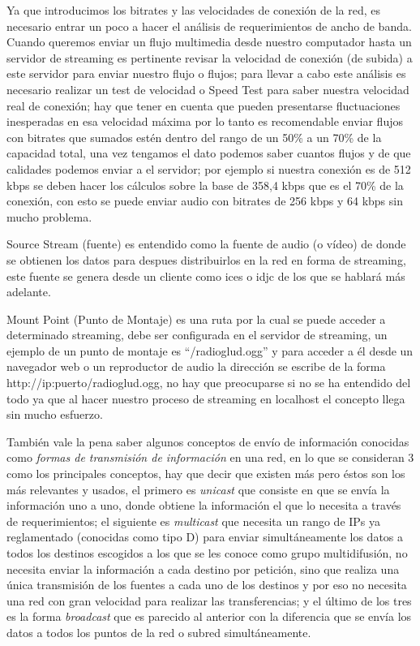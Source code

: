 \begin{multicols}{2}
Ya que introducimos los bitrates y las velocidades de conexión de la red, es necesario entrar un poco a hacer el análisis de requerimientos de ancho de banda. Cuando queremos enviar un flujo multimedia desde nuestro computador hasta un servidor de streaming es pertinente revisar la velocidad de conexión (de subida) a este servidor para enviar nuestro flujo o flujos; para llevar a cabo este análisis es necesario realizar  un test de velocidad o Speed Test para saber nuestra velocidad real de conexión; hay que tener en cuenta que pueden presentarse fluctuaciones inesperadas en esa velocidad máxima por lo tanto es recomendable enviar flujos con bitrates que sumados estén dentro del rango de un 50\% a un 70\% de la capacidad total, una vez tengamos el dato podemos saber cuantos flujos y de que calidades podemos enviar a el servidor; por ejemplo si nuestra conexión es de 512 kbps se deben hacer los cálculos sobre la base de 358,4 kbps que es el 70\% de la conexión, con esto se puede enviar audio con bitrates de 256 kbps y 64 kbps sin mucho problema.

Source Stream (fuente) es entendido como la fuente de audio (o vídeo) de donde se obtienen los datos para despues distribuirlos en la red en forma de streaming, este fuente se genera desde un cliente como ices o idjc de los que se hablará más adelante.

Mount Point (Punto de Montaje) es una ruta por la cual se puede acceder a determinado streaming, debe ser configurada en el servidor de streaming, un ejemplo de un punto de montaje es ``/radioglud.ogg'' y para acceder a él desde un navegador web o un reproductor de audio la dirección se escribe de la forma http://ip:puerto/radioglud.ogg, no hay que preocuparse si no se ha entendido del todo ya que al hacer nuestro proceso de streaming en localhost el concepto llega sin mucho esfuerzo.






También vale la pena saber algunos conceptos de envío de información conocidas como {\em formas de transmisión de información} en una red, en lo que se consideran 3 como los principales conceptos, hay que decir que existen más pero éstos son los más relevantes y usados, el primero es {\em unicast} que consiste en que se envía la información uno a uno, donde obtiene la información el que lo necesita a través de requerimientos; el siguiente es {\em multicast} que necesita un rango de IPs ya reglamentado (conocidas como tipo D) para enviar simultáneamente los datos a todos los destinos escogidos a los que se les conoce como grupo multidifusión, no necesita enviar la información a cada destino por petición, sino que realiza una única transmisión de los fuentes a cada uno de los destinos y por eso no necesita una red con gran velocidad para realizar las transferencias; y el último de los tres es la forma {\em broadcast} que es parecido al anterior con la diferencia que se envía los datos a todos los puntos de la red o subred simultáneamente.


\end{multicols}
